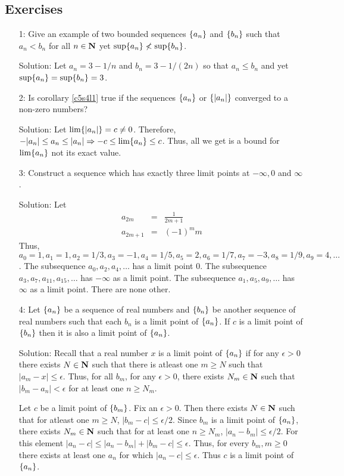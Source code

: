 \subsection{Exercises}
\begin{enumerate}
\item[1:] Give an example of two bounded sequences $\{a_n\}$ and 
$\{b_n\}$ such that $a_n < b_n$ for all $n \in \mathbf{N}$ yet $\sup\{a_n\} 
\nless \sup \{b_n\}$.
\item[Solution:] Let $a_n = 3 - 1/n$ and $b_n = 3 - 1/(2n)$ so that $a_n \le 
b_n$ and yet $\sup\{a_n\} = \sup\{b_n\} = 3$.

\item[2:] Is corollary \ref{c5s4l1} true if the sequences $\{a_n\}$ or
$\{|a_n|\}$ converged to a non-zero numbers?
\item[Solution:] Let $\lim\{|a_n|\} = c \ne 0$. Therefore, $-|a_n| \le a_n
\le |a_n| \Rightarrow -c \le \lim\{a_n\} \le c$. Thus, all we get is a
bound for $\lim\{a_n\}$ not its exact value.

\item[3:] Construct a sequence which has exactly three limit points at
$-\infty, 0$ and $\infty$.
\item[Solution:] Let
\begin{eqnarray*}
a_{2m} &=& \frac{1}{2m + 1} \\
a_{2m+1} &=& (-1)^m m
\end{eqnarray*}
Thus, $a_0 = 1, a_1 = 1, a_2 = 1/3, a_3 = -1, a_4 = 1/5, a_5 = 2, a_6 = 1/7,
a_7 = -3, a_8 = 1/9, a_9 = 4, \ldots$. The subsequence $a_0, a_2, a_4, 
\ldots$ has a limit point $0$. The subsequence $a_3, a_7, a_{11}, a_{15}, 
\ldots$ has $-\infty$ as a limit point. The subsequence $a_1, a_5, a_9, 
\ldots$ has $\infty$ as a limit point. There are none other.

\item[4:] Let $\{a_n\}$ be a sequence of real numbers and $\{b_n\}$ be
another sequence of real numbers such that each $b_n$ is a limit point
of $\{a_n\}$. If $c$ is a limit point of $\{b_n\}$ then it is also a
limit point of $\{a_n\}$.
\item[Solution:] Recall that a real number $x$ is a limit point of 
$\{a_n\}$ if for any $\epsilon > 0$ there exists $N \in \mathbf{N}$ such that 
there is atleast one $m \ge N$ such that $|a_m - x| \le \epsilon$. Thus,
for all $b_m$, for any $\epsilon > 0$, there exists $N_m \in \mathbf{N}$ such that
$|b_m - a_n| < \epsilon$ for at least one $n \ge N_m$.

Let $c$ be a limit point of $\{b_m\}$. Fix an $\epsilon > 0$. Then there
exists $N \in \mathbf{N}$ such that for atleast one $m \ge N$, $|b_m - c| \le 
\epsilon/2$.
Since $b_m$ is a limit point of $\{a_n\}$, there exists $N_m \in \mathbf{N}$
such that for at least one $n \ge N_m$, $|a_n - b_m| \le \epsilon/2$. For
this element $|a_n - c| \le |a_n - b_m| + |b_m - c| \le \epsilon$. Thus, for
every $b_m, m \ge 0$ there exists at least one $a_n$ for which $|a_n - c|
\le \epsilon$. Thus $c$ is a limit point of $\{a_n\}$.
\end{enumerate}

